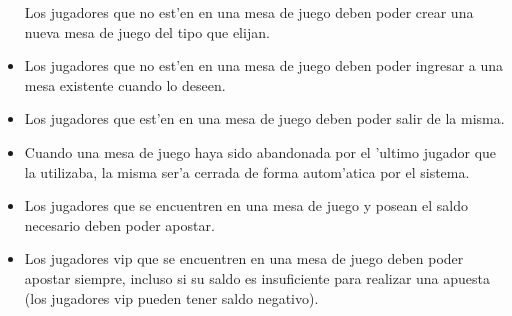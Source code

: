 \begin{itemize}
 Los jugadores que no est'en en una mesa de juego deben poder crear una nueva mesa de juego del tipo que elijan.

\item {} 

 Los jugadores que no est'en en una mesa de juego deben poder ingresar a una mesa existente cuando lo deseen.

\item {}

 Los jugadores que est'en en una mesa de juego deben poder salir de la misma.

\item {}

 Cuando una mesa de juego haya sido abandonada por el 'ultimo jugador que la utilizaba, la misma ser'a cerrada de forma autom'atica por el sistema.

\item {} 

 Los jugadores que se encuentren en una mesa de juego y posean el saldo necesario deben poder apostar.

\item {} 

 Los jugadores vip que se encuentren en una mesa de juego deben poder apostar siempre, incluso si su saldo es insuficiente para realizar una apuesta (los jugadores vip pueden tener saldo negativo).

\end{itemize}




